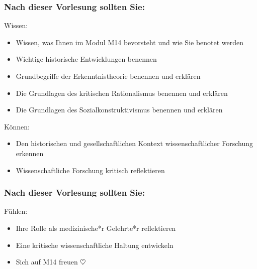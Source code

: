 \documentclass{beamer}
\newcommand{\heart}{\ensuremath\heartsuit} %
\begin{document}
 
\begin{frame}

\frametitle{Nach dieser Vorlesung sollten Sie:}



\begin{block}{Wissen:}
\begin{itemize}
\item
Wissen, was Ihnen im Modul M14 bevorsteht und wie Sie benotet werden

\item
Wichtige historische Entwicklungen benennen
\item 
Grundbegriffe der Erkenntnistheorie benennen und erklären
\item 
Die Grundlagen des kritischen Rationalismus benennen und erklären
\item 
Die Grundlagen des Sozialkonstruktivismus benennen und erklären
\end{itemize}

\end{block}

 

\begin{block}{Können:}
\begin{itemize}
\item
Den historischen und gesellschaftlichen Kontext wissenschaftlicher Forschung erkennen
\item 
Wissenschaftliche Forschung kritisch reflektieren
\end{itemize}
\end{block}

\end{frame}


\begin{frame}

\frametitle{Nach dieser Vorlesung sollten Sie:}

\begin{block}{Fühlen:}

\begin{itemize}
\item
Ihre Rolle als medizinische*r Gelehrte*r reflektieren
\item 
Eine kritische wissenschaftliche Haltung entwickeln
\item 
Sich auf M14 freuen $\heart$
\end{itemize}

\end{block}


\end{frame}
\end{document}
